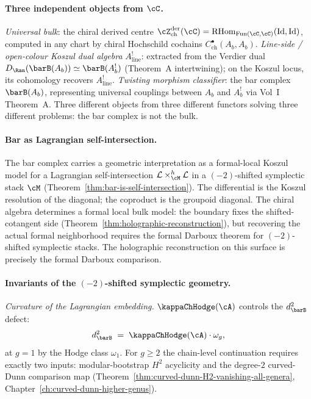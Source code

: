 \paragraph{Three independent objects from $\cC$.}
\emph{Universal bulk}: the chiral derived centre
$\cZ^{\mathrm{der}}_{\mathrm{ch}}(\cC) =
\RHom_{\operatorname{Fun}(\cC,\cC)}(\operatorname{Id},
\operatorname{Id})$, computed in any chart by chiral Hochschild
cochains $C^\bullet_{\mathrm{ch}}(A_b, A_b)$.
\emph{Line-side / open-colour Koszul dual algebra}
$A^!_{\mathrm{line}}$: extracted from the Verdier dual
$D_{\Ran}(\barB(A_b)) \simeq \barB(A_b^!)$ (Theorem~A
intertwining); on the Koszul locus, its cohomology recovers
$A^!_{\mathrm{line}}$.
\emph{Twisting morphism classifier}: the bar complex
$\barB(A_b)$, representing universal couplings between $A_b$
and $A_b^!$ via Vol~I Theorem~A. Three different objects from three different functors solving
three different problems: the bar complex is not the bulk.

\paragraph{Bar as Lagrangian self-intersection.}
The bar complex carries a geometric interpretation as a
formal-local Koszul model for a Lagrangian self-intersection
$\cL \times_{\cM}^h \cL$ in a $(-2)$-shifted symplectic stack
$\cM$ (Theorem~\ref{thm:bar-is-self-intersection}). The
differential is the Koszul resolution of the diagonal; the
coproduct is the groupoid diagonal. The chiral algebra
determines a formal local bulk model: the boundary fixes the
shifted-cotangent side
(Theorem~\ref{thm:holographic-reconstruction}), but recovering
the actual formal neighborhood requires the formal Darboux
theorem for $(-2)$-shifted symplectic stacks. The holographic
reconstruction on this surface is precisely the formal Darboux
comparison.

\paragraph{Invariants of the $(-2)$-shifted symplectic geometry.}
\emph{Curvature of the Lagrangian embedding.}
$\kappaChHodge(\cA)$ controls the $d_{\barB}^2$ defect:
\[
 d_{\barB}^2 \;=\; \kappaChHodge(\cA) \cdot \omega_g,
\]
at $g = 1$ by the Hodge class $\omega_1$. For $g \ge 2$ the
chain-level continuation requires exactly two inputs:
modular-bootstrap $H^2$ acyclicity and the degree-$2$
curved-Dunn comparison map
(Theorem~\ref{thm:curved-dunn-H2-vanishing-all-genera},
Chapter~\ref{ch:curved-dunn-higher-genus}).

